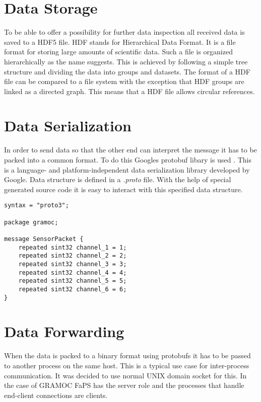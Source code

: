 
\section{Data Storage}

To be able to offer a possibility for further data inspection all received data is saved to a HDF5 file. HDF stands for Hierarchical Data Format. It is a file format for storing large amounts of scientific data. Such a file is organized hierarchically as the name suggests. This is achieved by following a simple tree structure and dividing the data into groups and datasets. The format of a HDF file can be compared to a file system with the exception that HDF groups are linked as a directed graph. This means that a HDF file allows circular references.

\section{Data Serialization}

In order to send data so that the other end can interpret the message it has to be packed into a common format. To do this Googles protobuf libary is used \cite{Protobuf}. This is a language- and platform-independent data serialization library developed by Google. Data structure is defined in a \textit{.proto} file. With the help of special generated source code it is easy to interact with this specified data structure.

\begin{lstlisting}[caption={The \textit{.proto} file used by GRAMOC}, captionpos=b]
syntax = "proto3";

package gramoc;

message SensorPacket {
    repeated sint32 channel_1 = 1;
    repeated sint32 channel_2 = 2;
    repeated sint32 channel_3 = 3;
    repeated sint32 channel_4 = 4;
    repeated sint32 channel_5 = 5;
    repeated sint32 channel_6 = 6;
}
\end{lstlisting}

\section{Data Forwarding}

When the data is packed to a binary format using protobufs it has to be passed to another process on the same host. This is a typical use case for inter-process communication. It was decided to use normal UNIX domain socket for this. In the case of GRAMOC FaPS has the server role and the processes that handle end-client connections are clients.

